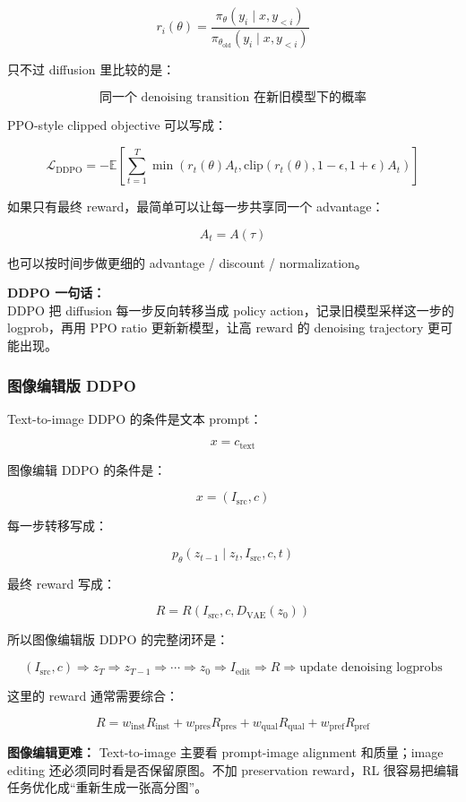 \[
r_i(\theta)
=
\frac{
\pi_\theta(y_i\mid x,y_{<i})
}{
\pi_{\theta_\text{old}}(y_i\mid x,y_{<i})
}
\]

只不过 diffusion 里比较的是：

\[
\text{同一个 denoising transition 在新旧模型下的概率}
\]

PPO-style clipped objective 可以写成：

\[
\mathcal{L}_\text{DDPO}
=
-
\mathbb{E}
\left[
\sum_{t=1}^{T}
\min
\left(
r_t(\theta)A_t,
\text{clip}(r_t(\theta),1-\epsilon,1+\epsilon)A_t
\right)
\right]
\]

如果只有最终 reward，最简单可以让每一步共享同一个 advantage：

\[
A_t=A(\tau)
\]

也可以按时间步做更细的 advantage / discount / normalization。

\begin{summarybox}
\textbf{DDPO 一句话：}\\
DDPO 把 diffusion 每一步反向转移当成 policy action，记录旧模型采样这一步的 logprob，再用 PPO ratio 更新新模型，让高 reward 的 denoising trajectory 更可能出现。
\end{summarybox}

\subsubsection{图像编辑版 DDPO}

Text-to-image DDPO 的条件是文本 prompt：

\[
x=c_\text{text}
\]

图像编辑 DDPO 的条件是：

\[
x=(I_\text{src},c)
\]

每一步转移写成：

\[
p_\theta(z_{t-1}\mid z_t,I_\text{src},c,t)
\]

最终 reward 写成：

\[
R
=
R(I_\text{src},c,D_\text{VAE}(z_0))
\]

所以图像编辑版 DDPO 的完整闭环是：

\[
(I_\text{src},c)
\Rightarrow
z_T
\Rightarrow
z_{T-1}
\Rightarrow
\cdots
\Rightarrow
z_0
\Rightarrow
I_\text{edit}
\Rightarrow
R
\Rightarrow
\text{update denoising logprobs}
\]

这里的 reward 通常需要综合：

\[
R
=
w_\text{inst}R_\text{inst}
+
w_\text{pres}R_\text{pres}
+
w_\text{qual}R_\text{qual}
+
w_\text{pref}R_\text{pref}
\]

\begin{warnbox}
\textbf{图像编辑更难：} Text-to-image 主要看 prompt-image alignment 和质量；image editing 还必须同时看是否保留原图。不加 preservation reward，RL 很容易把编辑任务优化成“重新生成一张高分图”。
\end{warnbox}

